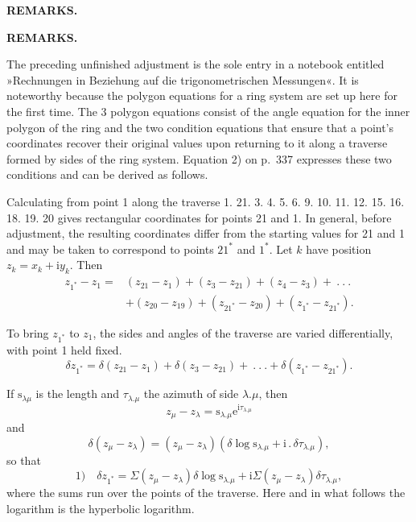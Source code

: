 \hfill\textbf{REMARKS.}\hfill\mbox{}
\begin{center}\textbf{REMARKS.}\end{center}

\par\noindent\hspace*{\parindent}The preceding unfinished adjustment is the sole entry in a notebook entitled »Rechnungen in Beziehung auf die trigonometrischen Messungen«. It is noteworthy because the polygon equations for a ring system are set up here for the first time. The 3 polygon equations consist of the angle equation for the inner polygon of the ring and the two condition equations that ensure that a point's coordinates recover their original values upon returning to it along a traverse formed by sides of the ring system. Equation 2) on p.~337 expresses these two conditions and can be derived as follows.

\par\noindent\hspace*{\parindent}Calculating from point 1 along the traverse 1. 21. 3. 4. 5. 6. 9. 10. 11. 12. 15. 16. 18. 19. 20 gives rectangular coordinates for points 21 and 1. In general, before adjustment, the resulting coordinates differ from the starting values for 21 and 1 and may be taken to correspond to points \(21^*\) and \(1^*\). Let \(k\) have position \(z_k=x_k+\mathrm{i}y_k\). Then
\[
\begin{aligned}
z_{1^*}-z_1={}&(z_{21}-z_1)+(z_3-z_{21})+(z_4-z_3)+\ .\ .\ .\\
&+(z_{20}-z_{19})+(z_{21^*}-z_{20})+(z_{1^*}-z_{21^*}).
\end{aligned}
\]
\par\noindent\hspace*{\parindent}To bring \(z_{1^*}\) to \(z_1\), the sides and angles of the traverse are varied differentially, with point 1 held fixed.
\[
\delta z_{1^*}=\delta(z_{21}-z_1)+\delta(z_3-z_{21})+\ .\ .\ .+\delta(z_{1^*}-z_{21^*}).
\]
\par\noindent\hspace*{\parindent}If \(\mathrm{s}_{\lambda\mu}\) is the length and \(\tau_{\lambda.\mu}\) the azimuth of side \(\lambda.\mu\), then
\[
z_\mu-z_\lambda=\mathrm{s}_{\lambda.\mu}\mathrm{e}^{\mathrm{i}\tau_{\lambda.\mu}}
\]
\noindent and
\[
\delta(z_\mu-z_\lambda)=(z_\mu-z_\lambda)(\delta\log\mathrm{s}_{\lambda.\mu}+\mathrm{i}\,.\,\delta\tau_{\lambda.\mu}),
\]
\noindent so that
\[
1)\quad\delta z_{1^*}=\Sigma(z_\mu-z_\lambda)\delta\log\mathrm{s}_{\lambda.\mu}+\mathrm{i}\Sigma(z_\mu-z_\lambda)\delta\tau_{\lambda.\mu},
\]
\noindent where the sums run over the points of the traverse. Here and in what follows the logarithm is the hyperbolic logarithm.

